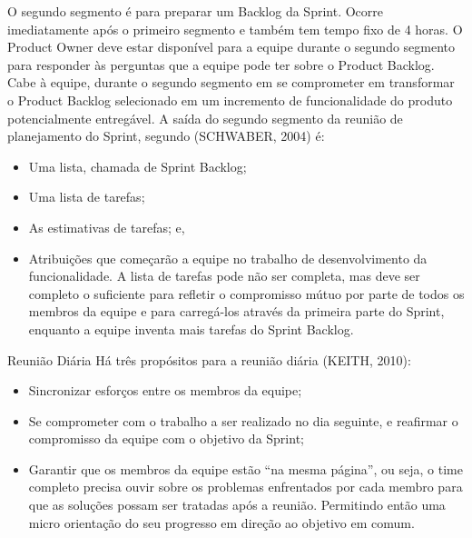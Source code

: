 O segundo segmento é para preparar um Backlog da Sprint. Ocorre imediatamente após o primeiro segmento e também tem tempo fixo de 4 horas. O Product Owner deve estar disponível para a equipe durante o segundo segmento para responder às perguntas que a equipe pode ter sobre o Product Backlog. Cabe à equipe, durante o segundo segmento em se comprometer em transformar o Product Backlog selecionado em um incremento de funcionalidade do produto potencialmente entregável. A saída do segundo segmento da reunião de planejamento do Sprint, segundo (SCHWABER, 2004) é:
\begin{itemize}
	\item Uma lista, chamada de Sprint Backlog;
	\item Uma lista de tarefas;
	\item As estimativas de tarefas; e,
	\item Atribuições que começarão a equipe no trabalho de desenvolvimento da funcionalidade. A lista de tarefas pode não ser completa, mas deve ser completo o suficiente para refletir o compromisso mútuo por parte de todos os membros da equipe e para carregá-los através da primeira parte do Sprint, enquanto a equipe inventa mais tarefas do Sprint Backlog.
\end{itemize}
Reunião Diária
Há três propósitos para a reunião diária (KEITH, 2010):
\begin{itemize}
	\item Sincronizar esforços entre os membros da equipe;
	\item Se comprometer com o trabalho a ser realizado no dia seguinte, e reafirmar o compromisso da equipe com o objetivo da Sprint;
	\item Garantir que os membros da equipe estão “na mesma página”, ou seja, o time completo precisa ouvir sobre os problemas enfrentados por cada membro para que as soluções possam ser tratadas após a reunião. Permitindo então uma micro orientação do seu progresso em direção ao objetivo em comum.
\end{itemize}

